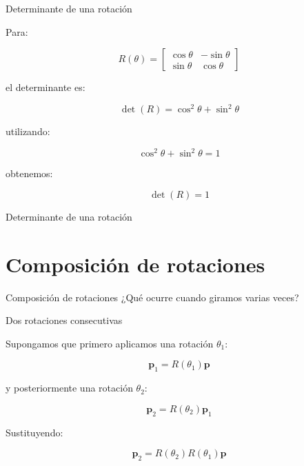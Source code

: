 \documentclass[aspectratio=169]{beamer}
\begin{document}
\begin{frame}{Determinante de una rotación}

    Para:

    \[
    R(\theta)
    =
    \begin{bmatrix}
        \cos\theta & -\sin\theta\\
        \sin\theta & \cos\theta
    \end{bmatrix}
    \]

    el determinante es:

    \[
    \det(R)
    =
    \cos^2\theta+\sin^2\theta
    \]

    utilizando:

    \[
    \cos^2\theta+\sin^2\theta=1
    \]

    obtenemos:

    \[
    \boxed{
        \det(R)=1
    }
    \]

\end{frame}

\begin{frame}{Determinante de una rotación}


    \vspace{0.3cm}


\end{frame}

\section{Composición de rotaciones}

\SectionSlide
{Composición de rotaciones}
{¿Qué ocurre cuando giramos varias veces?}

\begin{frame}{Dos rotaciones consecutivas}

    Supongamos que primero aplicamos una rotación $\theta_1$:

    \[
    \mathbf{p}_1
    =
    R(\theta_1)\mathbf{p}
    \]

    y posteriormente una rotación $\theta_2$:

    \[
    \mathbf{p}_2
    =
    R(\theta_2)\mathbf{p}_1
    \]

    Sustituyendo:

    \[
    \mathbf{p}_2
    =
    R(\theta_2)
    R(\theta_1)
    \mathbf{p}
    \]

\end{frame}
\end{document}
